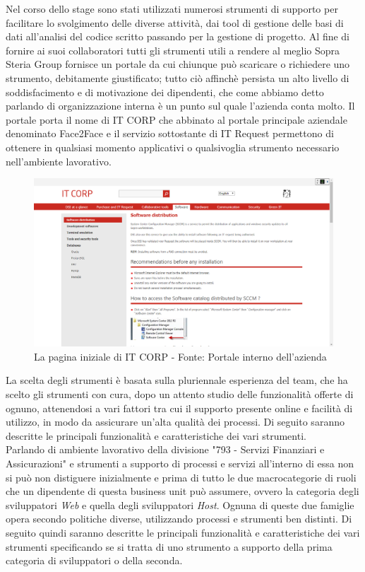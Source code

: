 	Nel corso dello stage sono stati utilizzati numerosi strumenti di supporto per facilitare lo svolgimento delle diverse attività, dai tool di gestione delle basi di dati all'analisi del codice scritto passando per la gestione di progetto. Al fine di fornire ai suoi collaboratori tutti gli strumenti utili a rendere al meglio Sopra Steria Group fornisce un portale da cui chiunque può scaricare o richiedere uno strumento, debitamente giustificato; tutto ciò affinchè persista un alto livello di soddisfacimento e di motivazione dei dipendenti, che come abbiamo detto parlando di organizzazione interna è un punto sul quale l'azienda conta molto. Il portale porta il nome di IT CORP che abbinato al portale principale aziendale denominato Face2Face e il servizio sottostante di IT Request permettono di ottenere in qualsiasi momento applicativi o qualsivoglia strumento necessario nell'ambiente lavorativo.

	\begin{figure}[H]
		\centering
	   	\includegraphics[width=1\textwidth]{immagini/ITCorp}
	   	\caption{La pagina iniziale di IT CORP - Fonte: Portale interno dell'azienda}
	\end{figure}
	
	La scelta degli strumenti è basata sulla pluriennale esperienza del team, che ha scelto gli strumenti con cura, dopo un attento studio delle funzionalità offerte di ognuno, attenendosi a vari fattori tra cui il supporto presente online e facilità di utilizzo, in modo da assicurare un'alta qualità dei processi. Di seguito saranno descritte le principali funzionalità e caratteristiche dei vari strumenti.\\

	Parlando di ambiente lavorativo della divisione "793 - Servizi Finanziari e Assicurazioni" e strumenti a supporto di processi e servizi all'interno di essa non si può non distiguere inizialmente e prima di tutto le due macrocategorie di ruoli che un dipendente di questa business unit può assumere, ovvero la categoria degli sviluppatori \textit{Web} e quella degli sviluppatori \textit{Host}. Ognuna di queste due famiglie opera secondo politiche diverse, utilizzando processi e strumenti ben distinti. Di seguito quindi saranno descritte le principali funzionalità e caratteristiche dei vari strumenti specificando se si tratta di uno strumento a supporto della prima categoria di sviluppatori o della seconda.
	
